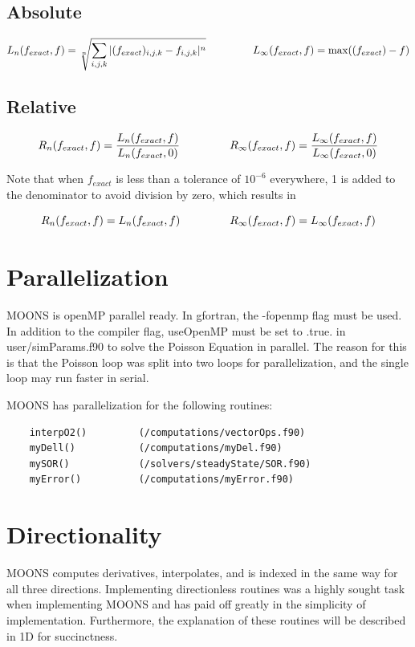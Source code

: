 \subsection{Absolute}
\begin{equation}
L_n(f_{exact},f) =  \sqrt[n]{\sum_{i,j,k} |(f_{exact})_{i,j,k} - f_{i,j,k}|^n} \;\;\;\;\;\;\;\;\;\;\;\;\;\;\;\;
L_\infty(f_{exact},f) = \max( (f_{exact}) - f )
\end{equation}

\subsection{Relative}
\begin{equation}
R_{n}(f_{exact},f) = \frac{L_n(f_{exact},f)}{L_n(f_{exact},0)} \;\;\;\;\;\;\;\;\;\;\;\;\;\;\;\;
R_{\infty}(f_{exact},f) = \frac{L_\infty(f_{exact},f)}{L_\infty(f_{exact},0)}
\end{equation}

Note that when $f_{exact}$ is less than a tolerance of $10^{-6}$ everywhere, 1 is added to the denominator to avoid division by zero, which results in

\begin{equation}
R_{n}(f_{exact},f) = L_n(f_{exact},f) \;\;\;\;\;\;\;\;\;\;\;\;\;\;\;\;
R_{\infty}(f_{exact},f) = L_\infty(f_{exact},f)
\end{equation}

\section{Parallelization}
MOONS is openMP parallel ready. In gfortran, the -fopenmp flag must be used. In addition to the compiler flag, useOpenMP must be set to .true. in user/simParams.f90 to solve the Poisson Equation in parallel. The reason for this is that the Poisson loop was split into two loops for parallelization, and the single loop may run faster in serial.

MOONS has parallelization for the following routines:

\begin{lstlisting}
    interpO2()         (/computations/vectorOps.f90)
    myDell()           (/computations/myDel.f90)
    mySOR()            (/solvers/steadyState/SOR.f90)
    myError()          (/computations/myError.f90)
\end{lstlisting}

\section{Directionality}
MOONS computes derivatives, interpolates, and is indexed in the same way for all three directions. Implementing directionless routines was a highly sought task when implementing MOONS and has paid off greatly in the simplicity of implementation. Furthermore, the explanation of these routines will be described in 1D for succinctness.

